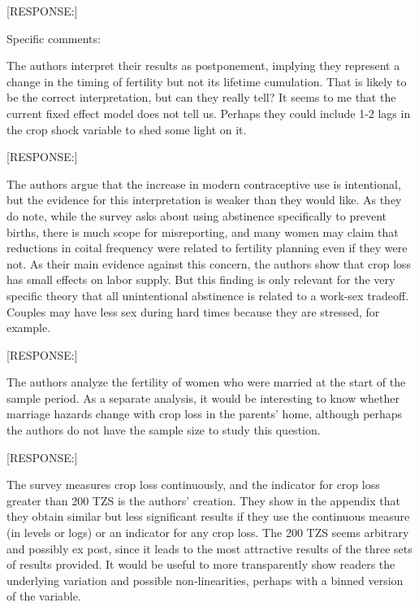 \documentclass[letterpaper,12pt]{article}
\begin{document}
[RESPONSE:]

Specific comments:

\begin{description}

\item The authors interpret their results as postponement, implying they
represent a change in the timing of fertility but not its lifetime
cumulation. That is likely to be the correct interpretation, but can
they really tell? It seems to me that the current fixed effect model
does not tell us. Perhaps they could include 1-2 lags in the crop shock
variable to shed some light on it.

[RESPONSE:]

\item The authors argue that the increase in modern contraceptive use is
intentional, but the evidence for this interpretation is weaker than
they would like. As they do note, while the survey asks about using
abstinence specifically to prevent births, there is much scope for
misreporting, and many women may claim that reductions in coital
frequency were related to fertility planning even if they were not. As
their main evidence against this concern, the authors show that crop
loss has small effects on labor supply. But this finding is only
relevant for the very specific theory that all unintentional abstinence
is related to a work-sex tradeoff. Couples may have less sex during hard
times because they are stressed, for example.

[RESPONSE:]

\item The authors analyze the fertility of women who were married at the
start of the sample period. As a separate analysis, it would be
interesting to know whether marriage hazards change with crop loss in
the parents' home, although perhaps the authors do not have the sample
size to study this question.

[RESPONSE:]

\item The survey measures crop loss continuously, and the indicator for
crop loss greater than 200 TZS is the authors' creation. They show in
the appendix that they obtain similar but less significant results if
they use the continuous measure (in levels or logs) or an indicator for
any crop loss. The 200 TZS seems arbitrary and possibly ex post, since
it leads to the most attractive results of the three sets of results
provided. It would be useful to more transparently show readers the
underlying variation and possible non-linearities, perhaps with a binned
version of the variable.


\end{description}
\end{document}
